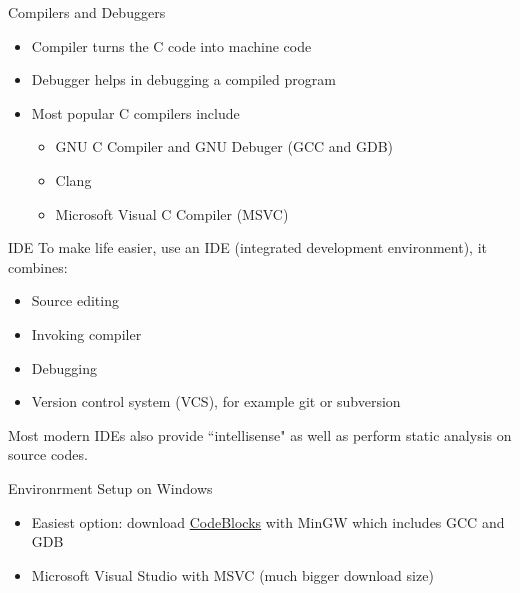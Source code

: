\documentclass[12pt, aspectratio=169]{beamer}
\begin{document}
    \begin{frame}{Compilers and Debuggers}
        \begin{itemize}
            \item Compiler turns the C code into machine code
            \item Debugger helps in debugging a compiled program
            \item Most popular C compilers include
            \begin{itemize}
                \item GNU C Compiler and GNU Debuger (GCC and GDB)
                \item Clang
                \item Microsoft Visual C Compiler (MSVC)
            \end{itemize}
        \end{itemize}
    \end{frame}

    \begin{frame}{IDE}
        To make life easier, use an IDE (integrated development environment), it combines:
        \begin{itemize}
            \item Source editing
            \item Invoking compiler
            \item Debugging
            \item Version control system (VCS), for example git or subversion
        \end{itemize}

        Most modern IDEs also provide ``intellisense" as well as perform static analysis on source codes.
    \end{frame}

    \begin{frame}{Environrment Setup on Windows}
        \begin{itemize}
            \item Easiest option: download \href{https://www.codeblocks.org/downloads/binaries/}{CodeBlocks} with MinGW which includes GCC and GDB
            \item Microsoft Visual Studio with MSVC (much bigger download size)
        \end{itemize}
    \end{frame}
\end{document}
